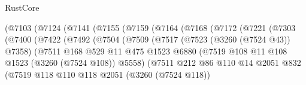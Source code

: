 \begin{lexlean}{RustCore}
\begin{coremodule}
                        (@7103
                          (@7124
                            (@7141
                              (@7155
                                (@7159
                                  (@7164
                                    (@7168
                                      (@7172
                                        (@7221
                                          (@7303
                                            (@7400
                                              (@7422
                                                (@7492
                                                  (@7504
                                                    (@7509
                                                      (@7517
                                                        (@7523 (@3260 (@7524 @43)) @7358)
                                                        (@7511
                                                          @168
                                                          @529
                                                          @11
                                                          @475
                                                          @1523
                                                          @6880
                                                          (@7519
                                                            @108
                                                            @11
                                                            @108
                                                            @1523
                                                            (@3260 (@7524 @108))
                                                            @5558)
                                                          (@7511
                                                            @212
                                                            @86
                                                            @110
                                                            @14
                                                            @2051
                                                            @832
                                                            (@7519
                                                              @118
                                                              @110
                                                              @118
                                                              @2051
                                                              (@3260 (@7524 @118))

\end{coremodule}
\end{lexlean}
